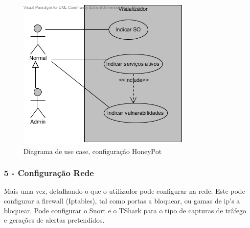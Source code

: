 \begin{figure}[!htb]
	\centering
	\includegraphics[scale=0.80]{images/ucs/ConfHoneyPot}
	\caption {Diagrama de use case, configuração HoneyPot}
\end{figure}
\pagebreak

\subsubsection{\textbf{5 - Configuração Rede}}

Mais uma vez, detalhando o que o utilizador pode configurar na rede. Este pode configurar a firewall (Iptables), tal como portas a bloquear, ou gamas
de ip's a bloquear. Pode configurar o Snort e o TShark para o tipo de capturas de trâfego e gerações de alertas pretendidos.

